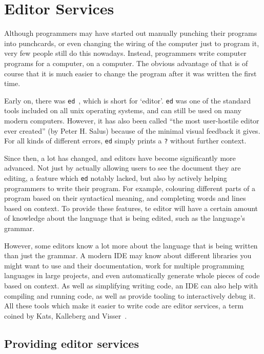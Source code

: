 

\chapter{Editor Services}
\label{chap:editor-services}

Although programmers may have started out manually punching their programs into punchcards,
or even changing the wiring of the computer just to program it, very few people still do this nowadays.
Instead, programmers write computer programs for a computer, on a computer.
The obvious advantage of that is of course that it is much easier to change the program after
it was written the first time.

Early on, there was \texttt{ed}~\autocite{ed}, which is short for `editor'.
\texttt{ed} was one of the standard tools included on all unix operating systems, and can still be used on many modern computers.
However, it has also been called ``the most user-hostile editor ever created'' (by Peter H. Salus) because of the
minimal visual feedback it gives.
For all kinds of different errors, \texttt{ed} simply prints a \texttt{?} without further context.

Since then, a lot has changed, and editors have become significantly more advanced.
Not just by actually allowing users to see the document they are editing, a feature which \texttt{ed} notably lacked,
but also by actively helping programmers to write their program.
For example, colouring different parts of a program based on their syntactical meaning, and completing words and lines based on context.
To provide these features, te editor will have a certain amount of knowledge about the language that is being edited, such as the language's grammar.

However, some editors know a lot more about the language that is being written than just the grammar.
A modern \ac{IDE} may know about different libraries you might want to use and their documentation,
work for multiple programming languages in large projects, and even automatically generate whole pieces of code based on context.
As well as simplifying writing code, an \ac{IDE} can also help with compiling and running code, as well as provide tooling to interactively debug it.
All these tools which make it easier to write code are editor services, a term coined by Kats, Kalleberg and Visser~\autocite*{KatsKV08}.


\section{Providing editor services}\label{sec:providing-editor-services}

